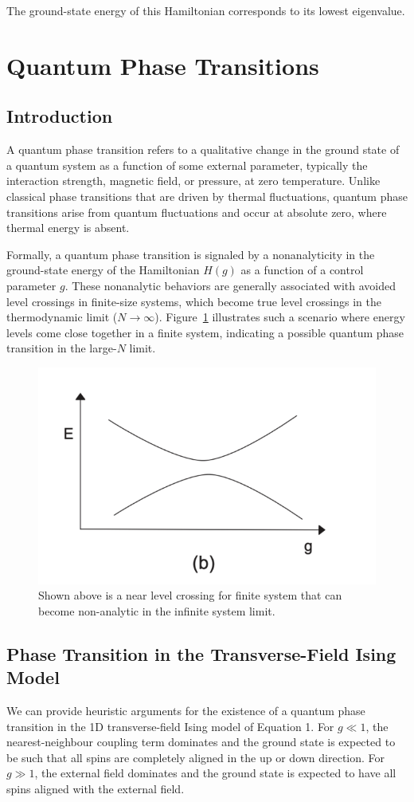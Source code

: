 \documentclass[a4paper]{article}
\begin{document}
The ground-state energy of this Hamiltonian corresponds to its lowest eigenvalue. 




\section{Quantum Phase Transitions} \label{2}%
\subsection{Introduction}
 A quantum phase transition refers to a qualitative change in the ground state of a quantum system as a function of some external parameter, typically the interaction strength, magnetic field, or pressure, at zero temperature. Unlike classical phase transitions that are driven by thermal fluctuations, quantum phase transitions arise from quantum fluctuations and occur at absolute zero, where thermal energy is absent.

Formally, a quantum phase transition is signaled by a nonanalyticity in the ground-state energy of the Hamiltonian $H(g)$ as a function of a control parameter $g$. These nonanalytic behaviors are generally associated with avoided level crossings in finite-size systems, which become true level crossings in the thermodynamic limit ($N \to \infty$). Figure~\ref{1} illustrates such a scenario where energy levels come close together in a finite system, indicating a possible quantum phase transition in the large-$N$ limit.

\begin{figure}
    \centering
    \includegraphics[width=0.5\linewidth]{images/截屏2025-05-22 21.25.44.png}
    \caption{Shown above is a near level crossing for finite system that can become non-analytic in the infinite system limit. }
    \label{1}
\end{figure}

 \subsection{Phase Transition in the Transverse-Field Ising Model}
We can provide heuristic arguments for the existence of a quantum phase transition in the 1D transverse-field Ising
model of Equation 1. For $g\ll1$, the nearest-neighbour coupling term dominates and the ground state is expected
to be such that all spins are completely aligned in the up or down direction. For $g\gg1$, the external field dominates
and the ground state is expected to have all spins aligned with the external field.
\end{document}
